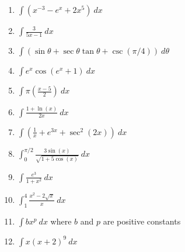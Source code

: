 \documentclass[12pt]{article}
\renewcommand{\emph}[1]{\textsf{\textbf{#1}}}
\newcounter{probcount}
\newcounter{subprobcount}
\newenvironment{subproblems}{%
\begin{enumerate}%
\setcounter{enumi}{\value{subprobcount}}%
\renewcommand{\theenumi}{\emph{\alph{enumi}}}}%
{\setcounter{subprobcount}{\value{enumi}}\end{enumerate}}
\newcommand{\ds}{\displaystyle}
\begin{document}
\begin{subproblems}


\item   $\ds \int (x^{-3}  - e^x + 2x^5) \: dx$\\
\vfill

\item   $\ds \int  \frac{3}{5x-1} \: dx$
\vfill

\item   $\ds \int \left(\sin \theta + \sec \theta \tan \theta  + \csc(\pi/4)\right) \: d\theta$\\
\vfill

\newpage

\item   $\ds \int e^x\cos(e^x+1) \: dx$ \\
\vfill

\item   $\ds \int \pi\left(\frac{x-5}{2}\right) \: dx$\\
\vfill

\item   $\ds \int \frac{1+\ln(x)}{2x} \: dx$
\vfill

\newpage

\item   $\ds \int \left(\frac{1}{x} + e^{3x} + \sec^2(2x) \right) \: dx$ \\
\vfill

\item   $\ds \int_0^{\pi/2} \frac{3 \sin(x)}{\sqrt{1+5\cos(x)}}\: dx$
\vfill

\item   $\ds \int \frac{e^3}{1+x^2} \: dx$\\
\vfill

\newpage

\item $\ds \int_1^4 \frac{x^2 - 2\sqrt{x}}{x} \: dx$\\
\vfill

\item   $\ds \int bx^p \: dx$ \hspace{.1in}   where $b$ and $p$ are positive constants
\vfill

\item   $\ds \int x(x+2)^{9}\: dx$\\
\vfill

\end{subproblems}
\end{document}
